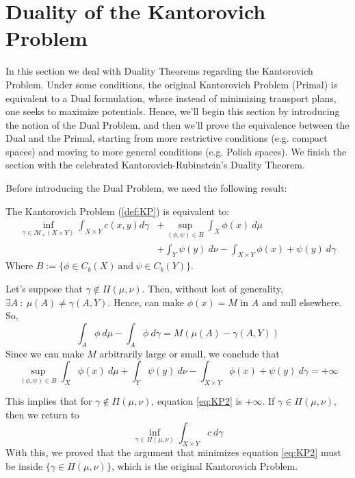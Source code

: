 \newpage
\section{Duality of the Kantorovich Problem}

In this section we deal with Duality Theorems regarding the Kantorovich Problem.
Under some conditions, the original Kantorovich Problem (Primal) is equivalent to a Dual
formulation, where instead of minimizing transport plans, one seeks to maximize potentials.
Hence, we'll begin this section by introducing the notion of the Dual Problem, and then we'll prove the
equivalence between the Dual and the Primal, starting from more restrictive conditions (e.g. compact spaces)
and moving to more general conditions (e.g. Polish spaces). We finish the section with the celebrated
Kantorovich-Rubinstein's Duality Theorem.

Before introducing the Dual Problem, we need the following result:
\begin{lemma}

  The Kantorovich Problem (\ref{def:KP}) is equivalent to:
\begin{align}
  \inf_{\gamma \in \mathcal M_+(X\times Y)}
  \int_{X \times Y} c(x,y)d\gamma &+
  \sup_{(\phi,\psi) \in B}
  \int_X \phi(x) \ d\mu
  \nonumber
  \\
  &+ \int_Y \psi(y) \ d\nu
  - \int_{X\times Y} \phi(x) + \psi(y) \ d\gamma
  \label{eq:KP2}
\end{align}
Where $B := \{\phi \in C_b(X) \ \mathrm{and} \ \psi \in C_b(Y)\}$.
\end{lemma}
\begin{prf}
  Let's suppose that $\gamma \notin \Pi(\mu,\nu)$.
  Then, without lost of generality, $\exists A \ : \ \mu(A) \neq
    \gamma(A,Y)$. Hence, can make $\phi(x) = M$ in $A$ and null elsewhere.
  So,
  \begin{equation*}
    \int_A \phi \ d\mu - \int_A \phi \ d\gamma	= M(\mu(A)-\gamma(A,Y))
  \end{equation*}
  Since we can make $M$ arbitrarily large or small, we conclude that
  \begin{equation*}
    \sup_{(\phi,\psi) \in B}
    \int_X \phi(x) \ d\mu + \int_Y \psi(y) \ d\nu -
    \int_{X\times Y} \phi(x) + \psi(y) \ d\gamma = +\infty
  \end{equation*}

  This implies that for $\gamma \notin \Pi(\mu,\nu)$, equation \eqref{eq:KP2}
  is $+\infty$. If $\gamma \in \Pi(\mu,\nu)$, then we return to
  \begin{equation*}
    \inf_{\gamma \in \Pi(\mu,\nu)} \int_{X\times Y} c \ d\gamma
  \end{equation*}
  With this, we proved that the argument that minimizes
  equation \eqref{eq:KP2} must
  be inside $\{\gamma \in \Pi(\mu,\nu)\}$, which is the original Kantorovich
  Problem.
\end{prf}

